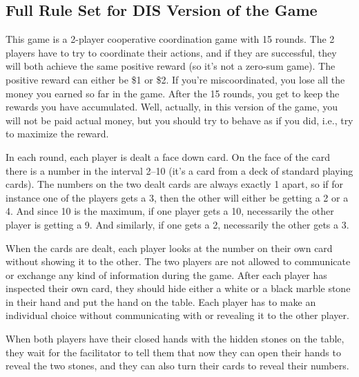 \documentclass[a4paper,superscriptaddress,nofootinbib]{revtex4}
\begin{document}
\subsection{Full Rule Set for DIS Version of the Game}

This game is a 2-player cooperative coordination game with 15 rounds. The 2 players have to try to coordinate their actions, and if they are successful, they will both achieve the same positive reward (so it's not a zero-sum game). The positive reward can either be \$1 or \$2. If you're miscoordinated, you lose all the money you earned so far in the game. After the 15 rounds, you get to keep the rewards you have accumulated. Well, actually, in this version of the game, you will not be paid actual money, but you should try to behave as if you did, i.e., try to maximize the reward.

  

In each round, each player is dealt a face down card. On the face of the card there is a number in the interval 2--10 (it's a card from a deck of standard playing cards). The numbers on the two dealt cards are always exactly 1 apart, so if for instance one of the players gets a 3, then the other will either be getting a 2 or a 4. And since 10 is the maximum, if one player gets a 10, necessarily the other player is getting a 9. And similarly, if one gets a 2, necessarily the other gets a 3.  

When the cards are dealt, each player looks at the number on their own card without showing it to the other. The two players are not allowed to communicate or exchange any kind of information during the game. After each player has inspected their own card, they should hide either a white or a black marble stone in their hand and put the hand on the table. Each player has to make an individual choice without communicating with or revealing it to the other player. 

When both players have their closed hands with the hidden stones on the table, they wait for the facilitator to tell them that now they can open their hands to reveal the two stones, and they can also turn their cards to reveal their numbers.  
\end{document}
